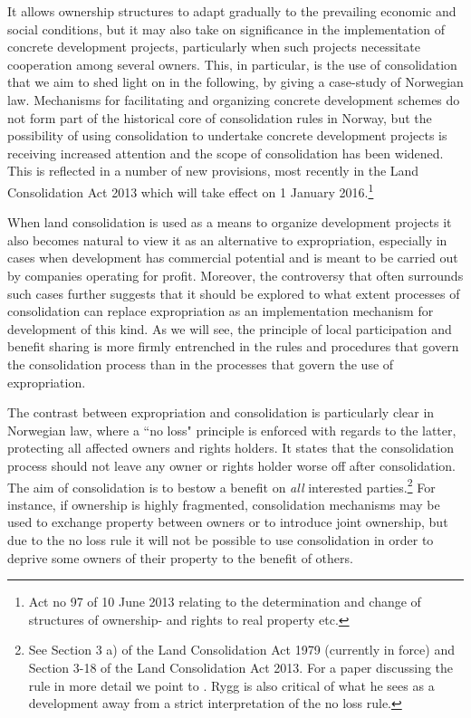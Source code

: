 \documentclass[10pt]{article} %
\begin{document}
It allows ownership structures to adapt gradually to the prevailing economic and social conditions, but it may also take on significance in the implementation of concrete development projects, particularly when such projects necessitate cooperation among several owners. This, in particular, is the use of consolidation that we aim to shed light on in the following, by giving a case-study of Norwegian law. Mechanisms for facilitating and organizing concrete development schemes do not form part of the historical core of consolidation rules in Norway, but the possibility of using consolidation to undertake concrete development projects is receiving increased attention and the scope of consolidation has been widened. This is reflected in a number of new provisions, most recently in the Land Consolidation Act 2013 which will take effect on 1 January 2016.\footnote{Act no 97 of 10 June 2013 relating to the determination and change of structures of ownership- and rights to real property etc.}

When land consolidation is used as a means to organize development projects it also becomes natural to view it as an alternative to expropriation, especially in cases when development has commercial potential and is meant to be carried out by companies operating for profit. Moreover, the controversy that often surrounds such cases further suggests that it should be explored to what extent processes of consolidation can replace expropriation as an implementation mechanism for development of this kind. As we will see, the principle of local participation and benefit sharing is more firmly entrenched in the rules and procedures that govern the consolidation process than in the processes that govern the use of expropriation. 

The contrast between expropriation and consolidation is particularly clear in Norwegian law, where a ``no loss" principle is enforced with regards to the latter, protecting all affected owners and rights holders. It states that the consolidation process should not leave any owner or rights holder worse off after consolidation. The aim of consolidation is to bestow a benefit on \emph{all} interested parties.\footnote{See Section 3 a) of the Land Consolidation Act 1979 (currently in force) and Section 3-18 of the Land Consolidation Act 2013. For a paper discussing the rule in more detail we point to \cite{rygg1998}. Rygg is also critical of what he sees as a development away from a strict interpretation of the no loss rule.} For instance, if ownership is highly fragmented, consolidation mechanisms may be used to exchange property between owners or to introduce joint ownership, but due to the no loss rule it will not be possible to use consolidation in order to deprive some owners of their property to the benefit of others.
\end{document}
